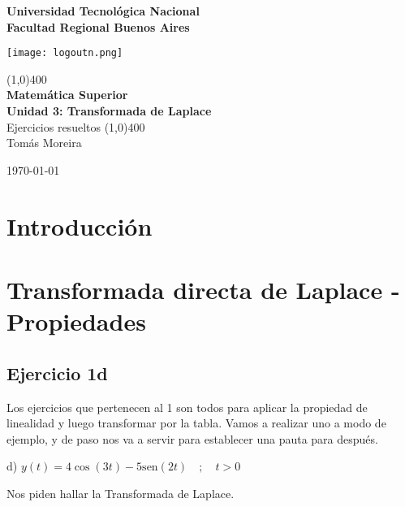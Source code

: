 \documentclass[11pt]{article}
\def\sen{\mathrm{sen}}
\begin{document}
		
	\begin{titlepage}
		\begin{center}
			\vspace*{0.5cm}
			\Large{\textbf{Universidad Tecnológica Nacional}}\\
			\Large{\textbf{Facultad Regional Buenos Aires}}\\
			\begin{center}
				\texttt{[image: logoutn.png]}
			\end{center}
			\vfill
			\line(1,0){400}\\
			\vspace*{0.3cm}
			\huge{\textbf{Matemática Superior}}\\
			\Large{\textbf{Unidad 3: Transformada de Laplace}}\\
			\large{Ejercicios resueltos}
			\line(1,0){400}\\
			\vfill
			Tomás Moreira \\
			
			
			\today
				
				
		\end{center}
	\end{titlepage}

	\tableofcontents
	\thispagestyle{empty}
	\clearpage

	\setcounter{page}{1}
	\section{Introducción}
	\section{Transformada directa de Laplace - Propiedades}
	\subsection{Ejercicio 1d}
	Los ejercicios que pertenecen al 1 son todos para aplicar la propiedad de linealidad y luego transformar por la tabla. Vamos a realizar uno a modo de ejemplo, y de paso nos va a servir para establecer una pauta para después.
	
	d) $y(t)=4\cos(3t)-5\sen(2t)\quad;\quad t>0$
	
	Nos piden hallar la Transformada de Laplace.
	
\end{document}
